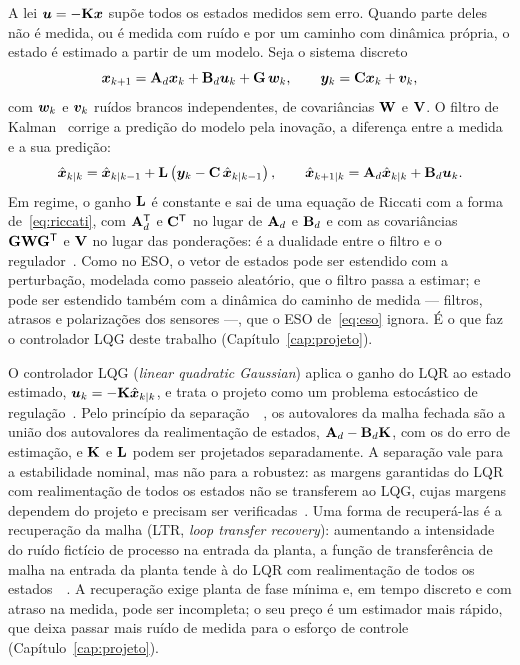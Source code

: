 A lei $\bm{u} = -\mathbf{K}\bm{x}$ supõe todos os estados medidos sem
erro. Quando parte deles não é medida, ou é medida com ruído e por um caminho
com dinâmica própria, o estado é estimado a partir de um modelo. Seja o
sistema discreto
\begin{equation}
\bm{x}_{k+1} = \mathbf{A}_d\bm{x}_k + \mathbf{B}_d\bm{u}_k
                + \mathbf{G}\,\bm{w}_k,
\qquad
\bm{y}_k = \mathbf{C}\bm{x}_k + \bm{v}_k,
\label{eq:modelo-estocastico}
\end{equation}
com $\bm{w}_k$ e $\bm{v}_k$ ruídos brancos independentes, de
covariâncias $\mathbf{W}$ e $\mathbf{V}$. O filtro de
Kalman~\cite{kalman1960b} corrige a predição do modelo pela inovação, a
diferença entre a medida e a sua predição:
\begin{equation}
\hat{\bm{x}}_{k|k} = \hat{\bm{x}}_{k|k-1}
    + \mathbf{L}\left(\bm{y}_k - \mathbf{C}\,\hat{\bm{x}}_{k|k-1}\right),
\qquad
\hat{\bm{x}}_{k+1|k} = \mathbf{A}_d\hat{\bm{x}}_{k|k} + \mathbf{B}_d\bm{u}_k.
\label{eq:kalman}
\end{equation}
Em regime, o ganho $\mathbf{L}$ é constante e sai de uma equação de Riccati
com a forma de~\eqref{eq:riccati}, com $\mathbf{A}_d^{\mathsf{T}}$ e
$\mathbf{C}^{\mathsf{T}}$ no lugar de $\mathbf{A}_d$ e $\mathbf{B}_d$ e com as
covariâncias $\mathbf{G}\mathbf{W}\mathbf{G}^{\mathsf{T}}$ e $\mathbf{V}$ no
lugar das ponderações: é a dualidade entre o filtro e o
regulador~\cite{kalman1960b}. Como no ESO, o vetor de estados pode ser
estendido com a perturbação, modelada como passeio aleatório, que o filtro
passa a estimar; e pode ser estendido também com a dinâmica do caminho de
medida --- filtros, atrasos e polarizações dos sensores ---, que o ESO
de~\eqref{eq:eso} ignora. É o que faz o controlador LQG deste trabalho
(Capítulo~\ref{cap:projeto}).

O controlador LQG (\textit{linear quadratic Gaussian}) aplica o ganho do LQR
ao estado estimado, $\bm{u}_k = -\mathbf{K}\hat{\bm{x}}_{k|k}$, e trata
o projeto como um problema estocástico de regulação~\cite{athans1971}. Pelo
princípio da separação~\cite{joseph1961}~\cite[seção~8.2]{anderson1989}, os
autovalores da malha fechada são a união dos autovalores da realimentação de
estados, $\mathbf{A}_d - \mathbf{B}_d\mathbf{K}$, com os do erro de
estimação, e $\mathbf{K}$ e $\mathbf{L}$ podem ser projetados separadamente.
A separação vale para a estabilidade nominal, mas não para a robustez: as
margens garantidas do LQR com realimentação de todos os estados não se
transferem ao LQG, cujas margens dependem do projeto e precisam ser
verificadas~\cite{doyle1978}. Uma forma de recuperá-las é a recuperação da
malha (LTR, \textit{loop transfer recovery}): aumentando a intensidade do
ruído fictício de processo na entrada da planta, a função de transferência de
malha na entrada da planta tende à do LQR com realimentação de todos os
estados~\cite{doyle1979,doyle1981}~\cite[seção~8.4]{anderson1989}. A
recuperação exige planta de fase mínima e, em tempo discreto e com atraso na
medida, pode ser incompleta; o seu preço é um estimador mais rápido, que deixa
passar mais ruído de medida para o esforço de controle
(Capítulo~\ref{cap:projeto}).

